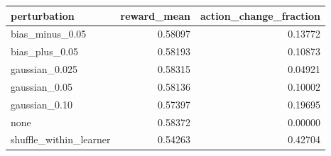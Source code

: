 \begin{tabular}{lrr}
\toprule
perturbation & reward\_mean & action\_change\_fraction \\
\midrule
bias\_minus\_0.05 & 0.58097 & 0.13772 \\
bias\_plus\_0.05 & 0.58193 & 0.10873 \\
gaussian\_0.025 & 0.58315 & 0.04921 \\
gaussian\_0.05 & 0.58136 & 0.10002 \\
gaussian\_0.10 & 0.57397 & 0.19695 \\
none & 0.58372 & 0.00000 \\
shuffle\_within\_learner & 0.54263 & 0.42704 \\
\bottomrule
\end{tabular}
